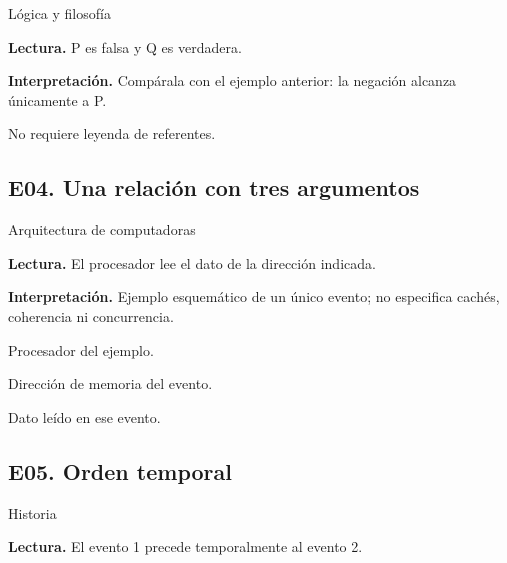 {\small\sffamily\color{KalaAcento}Lógica y filosofía}


\textbf{Lectura.} P es falsa y Q es verdadera.

\textbf{Interpretación.} Compárala con el ejemplo anterior: la negación alcanza únicamente a P.

{\small\color{KalaSuave}No requiere leyenda de referentes.}

\vspace{6mm}

\subsection{E04. Una relación con tres argumentos}

{\small\sffamily\color{KalaAcento}Arquitectura de computadoras}


\textbf{Lectura.} El procesador lee el dato de la dirección indicada.

\textbf{Interpretación.} Ejemplo esquemático de un único evento; no especifica cachés, coherencia ni concurrencia.

\begin{description}[font=\normalfont\bfseries,leftmargin=10mm]

\item[1] Procesador del ejemplo.

\item[2] Dirección de memoria del evento.

\item[3] Dato leído en ese evento.

\end{description}

\clearpage

\subsection{E05. Orden temporal}

{\small\sffamily\color{KalaAcento}Historia}


\textbf{Lectura.} El evento 1 precede temporalmente al evento 2.

